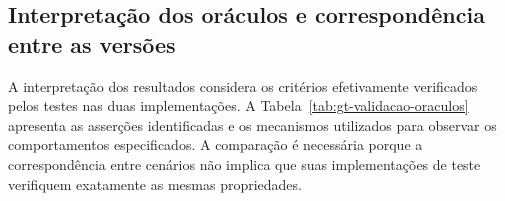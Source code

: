 \subsection{Interpretação dos oráculos e correspondência entre as versões}
\label{subsec:gt-validacao-oraculos}

A interpretação dos resultados considera os critérios efetivamente verificados pelos testes nas duas implementações. A Tabela~\ref{tab:gt-validacao-oraculos} apresenta as asserções identificadas e os mecanismos utilizados para observar os comportamentos especificados. A comparação é necessária porque a correspondência entre cenários não implica que suas implementações de teste verifiquem exatamente as mesmas propriedades.


